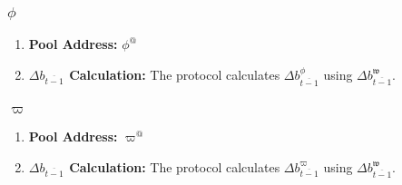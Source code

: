 \documentclass[class=article, crop=false]{standalone}
\begin{document}

\subsubsection{$\phi$}

    \begin{enumerate}
        \item \textbf{Pool Address:} $\phi^{@}$
            
        \item \textbf{$\Delta b_{\overline{t-1}}$ Calculation:} The protocol calculates $\Delta b_{\overline{t-1}}^{\phi}$ using $\Delta b_{\overline{t-1}}^{\mathfrak{w}}$.
    \end{enumerate}


\subsubsection{$\varpi$}

    \begin{enumerate}
        \item \textbf{Pool Address:} $\varpi^{@}$
            
        \item \textbf{$\Delta b_{\overline{t-1}}$ Calculation:} The protocol calculates $\Delta b_{\overline{t-1}}^{\varpi}$ using $\Delta b_{\overline{t-1}}^{\mathfrak{w}}$.
    \end{enumerate}
    
\end{document}

